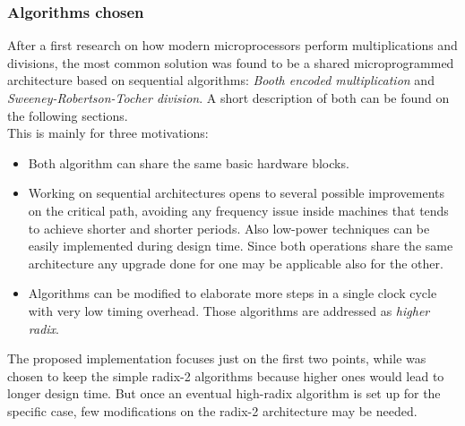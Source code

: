 \subsubsection{Algorithms chosen}
After a first research on how modern microprocessors perform multiplications and divisions, the most common solution was found to be a shared microprogrammed architecture based on sequential algorithms: \textit{Booth encoded multiplication} and \textit{Sweeney-Robertson-Tocher division}. A short description of both can be found on the following sections.\\
This is mainly for three motivations:
\begin{itemize}
    \item Both algorithm can share the same basic hardware blocks. 
    \item Working on sequential architectures opens to several possible improvements on the critical path, avoiding any frequency issue inside machines that tends to achieve shorter and shorter periods. Also low-power techniques can be easily implemented during design time. Since both operations share the same architecture any upgrade done for one may be applicable also for the other.
    \item Algorithms can be modified to elaborate more steps in a single clock cycle with very low timing overhead. Those algorithms are addressed as \textit{higher radix}.
\end{itemize}
The proposed implementation focuses just on the first two points, while was chosen to keep the simple radix-2 algorithms because higher ones would lead to longer design time. But once an eventual high-radix algorithm is set up for the specific case, few modifications on the radix-2 architecture may be needed.
